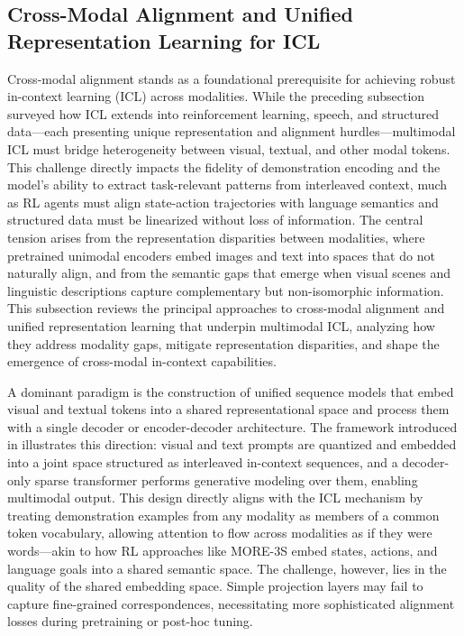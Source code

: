 \documentclass[11pt]{article}
\begin{document}
\subsection{Cross-Modal Alignment and Unified Representation Learning for ICL}

Cross-modal alignment stands as a foundational prerequisite for achieving robust in-context learning (ICL) across modalities. While the preceding subsection surveyed how ICL extends into reinforcement learning, speech, and structured data---each presenting unique representation and alignment hurdles---multimodal ICL must bridge heterogeneity between visual, textual, and other modal tokens. This challenge directly impacts the fidelity of demonstration encoding and the model's ability to extract task-relevant patterns from interleaved context, much as RL agents must align state-action trajectories with language semantics and structured data must be linearized without loss of information. The central tension arises from the representation disparities between modalities, where pretrained unimodal encoders embed images and text into spaces that do not naturally align, and from the semantic gaps that emerge when visual scenes and linguistic descriptions capture complementary but non-isomorphic information. This subsection reviews the principal approaches to cross-modal alignment and unified representation learning that underpin multimodal ICL, analyzing how they address modality gaps, mitigate representation disparities, and shape the emergence of cross-modal in-context capabilities.

A dominant paradigm is the construction of unified sequence models that embed visual and textual tokens into a shared representational space and process them with a single decoder or encoder-decoder architecture. The framework introduced in \cite{ref126} illustrates this direction: visual and text prompts are quantized and embedded into a joint space structured as interleaved in-context sequences, and a decoder-only sparse transformer performs generative modeling over them, enabling multimodal output. This design directly aligns with the ICL mechanism by treating demonstration examples from any modality as members of a common token vocabulary, allowing attention to flow across modalities as if they were words---akin to how RL approaches like MORE-3S embed states, actions, and language goals into a shared semantic space. The challenge, however, lies in the quality of the shared embedding space. Simple projection layers may fail to capture fine-grained correspondences, necessitating more sophisticated alignment losses during pretraining or post-hoc tuning.
\end{document}
